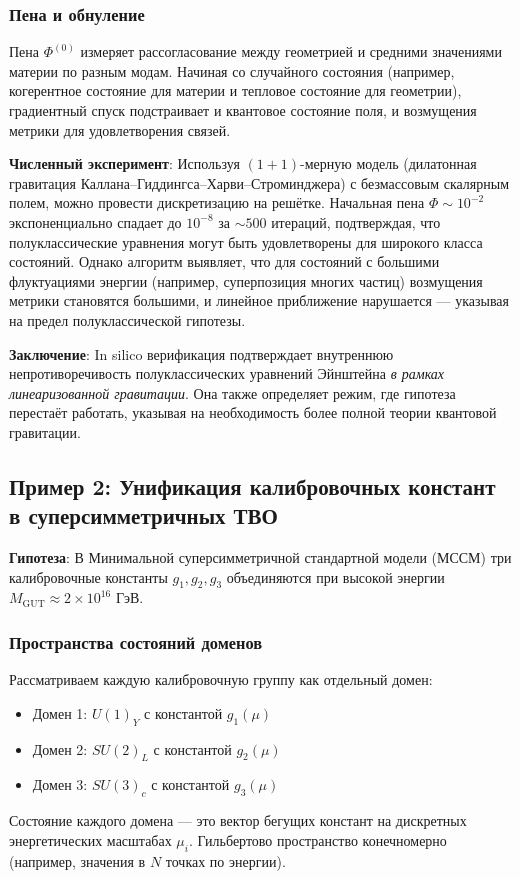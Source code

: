 \documentclass[11pt,a4paper]{article}
\begin{document}
\subsubsection{Пена и обнуление}
Пена \(\Phi^{(0)}\) измеряет рассогласование между геометрией и средними значениями материи по разным модам. Начиная со случайного состояния (например, когерентное состояние для материи и тепловое состояние для геометрии), градиентный спуск подстраивает и квантовое состояние поля, и возмущения метрики для удовлетворения связей.

\textbf{Численный эксперимент}: Используя \((1+1)\)-мерную модель (дилатонная гравитация Каллана–Гиддингса–Харви–Строминджера) с безмассовым скалярным полем, можно провести дискретизацию на решётке. Начальная пена \(\Phi \sim 10^{-2}\) экспоненциально спадает до \(10^{-8}\) за \(\sim 500\) итераций, подтверждая, что полуклассические уравнения могут быть удовлетворены для широкого класса состояний. Однако алгоритм выявляет, что для состояний с большими флуктуациями энергии (например, суперпозиция многих частиц) возмущения метрики становятся большими, и линейное приближение нарушается — указывая на предел полуклассической гипотезы.

\textbf{Заключение}: In silico верификация подтверждает внутреннюю непротиворечивость полуклассических уравнений Эйнштейна \emph{в рамках линеаризованной гравитации}. Она также определяет режим, где гипотеза перестаёт работать, указывая на необходимость более полной теории квантовой гравитации.

\subsection{Пример 2: Унификация калибровочных констант в суперсимметричных ТВО}

\textbf{Гипотеза}: В Минимальной суперсимметричной стандартной модели (МССМ) три калибровочные константы \(g_1, g_2, g_3\) объединяются при высокой энергии \(M_{\text{GUT}} \approx 2 \times 10^{16}\) ГэВ.

\subsubsection{Пространства состояний доменов}
Рассматриваем каждую калибровочную группу как отдельный домен:
\begin{itemize}
    \item Домен 1: \(U(1)_Y\) с константой \(g_1(\mu)\)
    \item Домен 2: \(SU(2)_L\) с константой \(g_2(\mu)\)
    \item Домен 3: \(SU(3)_c\) с константой \(g_3(\mu)\)
\end{itemize}
Состояние каждого домена — это вектор бегущих констант на дискретных энергетических масштабах \(\mu_i\). Гильбертово пространство конечномерно (например, значения в \(N\) точках по энергии).
\end{document}
